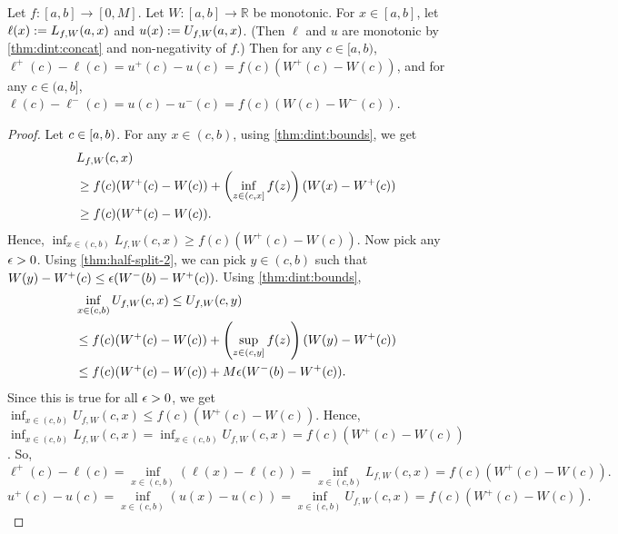 \documentclass[a4paper,12pt,fleqn]{article}
\begin{document}
\begin{lemma}
\label{thm:dint:eps}
Let $f: [a, b] \to [0, M]$.
Let $W: [a, b] \to \mathbb{R}$ be monotonic.
For $x \in [a, b]$, let $\ell(x) := L_{f,W}(a, x)$ and $u(x) := U_{f,W}(a, x)$.
(Then $\ell$ and $u$ are monotonic by \cref{thm:dint:concat} and non-negativity of $f$.)
Then for any $c \in [a, b)$, $\ell^+(c) - \ell(c) = u^+(c) - u(c) = f(c)(W^+(c)-W(c))$,
and for any $c \in (a, b]$, $\ell(c) - \ell^-(c) = u(c) - u^-(c) = f(c)(W(c)-W^-(c))$.
\end{lemma}
\begin{proof}
Let $c \in [a, b)$.
For any $x \in (c, b)$, using \cref{thm:dint:bounds}, we get
\begin{align*}
& L_{f,W}(c, x)
\\ &\ge f(c)(W^+(c)-W(c)) + \left(\inf_{z \in (c, x]} f(z)\right)(W(x)-W^+(c))
\\ &\ge f(c)(W^+(c)-W(c)).
\end{align*}
Hence, $\inf_{x \in (c, b)} L_{f,W}(c, x) \ge f(c)(W^+(c)-W(c))$.
Now pick any $\epsilon > 0$.
Using \cref{thm:half-split-2}, we can pick $y \in (c, b)$
such that $W(y) - W^+(c) \le \epsilon(W^-(b)-W^+(c))$.
Using \cref{thm:dint:bounds},
\begin{align*}
& \inf_{x \in (c, b)} U_{f,W}(c, x) \le U_{f,W}(c, y)
\\ &\le f(c)(W^+(c)-W(c)) + \left(\sup_{z \in (c, y]}f(z)\right)(W(y)-W^+(c))
\\ &\le f(c)(W^+(c)-W(c)) + M\epsilon(W^-(b)-W^+(c)).
\end{align*}
Since this is true for all $\epsilon > 0$, we get
$\inf_{x \in (c, b)} U_{f,W}(c, x) \le f(c)(W^+(c)-W(c))$.
Hence, $\inf_{x \in (c, b)} L_{f,W}(c, x) = \inf_{x \in (c, b)} U_{f,W}(c, x) = f(c)(W^+(c)-W(c))$.
So,
\[ \ell^+(c) - \ell(c) = \inf_{x \in (c, b)} (\ell(x) - \ell(c))
    = \inf_{x \in (c, b)} L_{f,W}(c, x) = f(c)(W^+(c)-W(c)). \]
\[ u^+(c) - u(c) = \inf_{x \in (c, b)} (u(x) - u(c))
    = \inf_{x \in (c, b)} U_{f,W}(c, x) = f(c)(W^+(c)-W(c)). \]


\end{proof}
\end{document}
